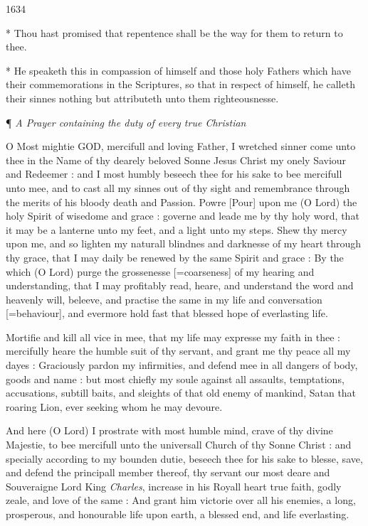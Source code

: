 1634

* Thou
hast promised that repentence shall be the way for them to return to thee.

* He speaketh
this in compassion of himself and those holy Fathers which have their
commemorations in the Scriptures, so that in respect of himself, he calleth
their sinnes nothing but attributeth unto them righteousnesse.

¶
\emph{A Prayer containing the duty of every true Christian}

O
Most mightie GOD, mercifull and loving Father, I wretched sinner come
unto thee in the Name of thy dearely beloved Sonne Jesus Christ my onely
Saviour and Redeemer : and I most humbly beseech thee for his sake to
bee mercifull unto mee, and to cast all my sinnes out of thy sight and
remembrance through the merits of his bloody death and Passion. Powre
[Pour]
upon me (O Lord) the holy Spirit of wisedome and grace : governe and leade
me by thy holy word, that it may be a lanterne unto my feet, and a light
unto my steps. Shew thy mercy upon me, and so lighten my naturall blindnes
and darknesse of my heart through thy grace, that I may daily be renewed
by the same Spirit and grace : By the which (O Lord) purge the grossenesse
[=coarseness]
of my hearing and understanding, that I may profitably read, heare, and
understand the word and heavenly will, beleeve, and practise the same
in my life and conversation [=behaviour],
and evermore hold fast that blessed hope of everlasting life.

Mortifie and kill all vice in mee, that my life may
expresse my faith in thee : mercifully heare the humble suit of thy servant,
and grant me thy peace all my dayes : Graciously pardon my infirmities,
and defend mee in all dangers of body, goods and name : but most chiefly
my soule against all assaults, temptations, accusations, subtill baits,
and sleights of that old enemy of mankind, Satan that roaring Lion, ever
seeking whom he may devoure.

And here (O Lord) I prostrate with most humble mind,
crave of thy divine Majestie, to bee mercifull unto the universall Church
of thy Sonne Christ : and specially according to my bounden dutie, beseech
thee for his sake to blesse, save, and defend the principall member thereof,
thy servant our most deare and Souveraigne Lord King \emph{Charles}, increase
in his Royall heart true faith, godly zeale, and love of the same : And
grant him victorie over all his enemies, a long, prosperous, and honourable
life upon earth, a blessed end, and life everlasting.

